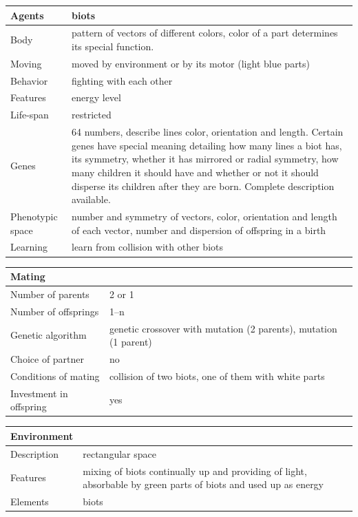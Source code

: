 \documentclass[a4paper,12pt]{report}
\begin{document}
 
\vspace{20pt}
 \begin{tabular}{|p{150pt}|p{220pt}|}
\hline
\textbf{Agents}&biots\\ \hline
Body&pattern of vectors of different colors, color of a part determines its special function.\\ \hline
Moving&moved by environment or by its motor (light blue parts)\\ \hline
Behavior&fighting with each other\\ \hline
Features&energy level\\ \hline
Life-span&restricted\\ \hline
Genes&64 numbers, describe lines color, orientation and length. Certain genes have special meaning detailing how many lines a biot has, its symmetry, whether it has mirrored or radial symmetry, how many children it should have and whether or not it should disperse its children after they are born. Complete description available.\\ \hline
Phenotypic space&number and symmetry of vectors, color, orientation and length of each vector, number and dispersion of offspring in a birth\\ \hline
Learning&learn from collision with other biots\\ \hline
\end{tabular} 

 \vspace{10pt}
 \begin{tabular}{|p{150pt}|p{220pt}|} \hline \textbf{Mating}&\\ \hline
Number of parents&2 or 1\\ \hline
Number of offsprings&1--n\\ \hline
Genetic algorithm&genetic crossover with mutation (2 parents), mutation (1 parent)\\ \hline
Choice of partner&no\\ \hline
Conditions of mating&collision of two biots, one of them with white parts\\ \hline
Investment in offspring&yes\\ \hline
\end{tabular} 

 \vspace{10pt}
 \begin{tabular}{|p{150pt}|p{220pt}|} \hline \textbf{Environment}&\\ \hline
Description&rectangular space\\ \hline
Features& mixing of biots continually up and providing of light, absorbable by green parts of biots and used up as energy\\ \hline
Elements&biots\\ \hline
\end{tabular} 
\end{document}
